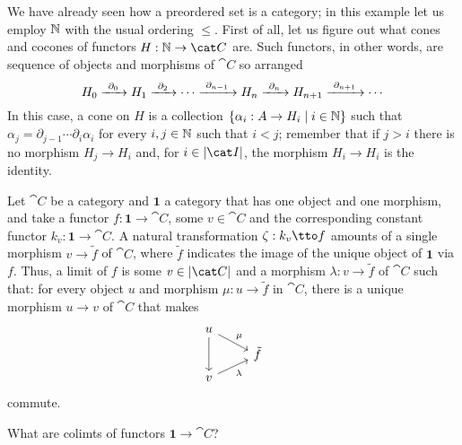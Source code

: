\begin{example}
We have already seen how a preordered set is a category; in this example let us employ \(\mathbb N\) with the usual ordering \(\le\). First of all, let us figure out what cones and cocones of functors \(H : \naturals \to \cat C\) are. Such functors, in other words, are sequence of objects and morphisms of \(\cat C\) so arranged
\[H_0 \xrightarrow{\ \partial_0\ } H_1 \xrightarrow{\ \partial_2\ } \cdots \xrightarrow{\ \partial_{n-1}\ } H_n \xrightarrow{\ \partial_n\ } H_{n+1} \xrightarrow{\ \partial_{n+1}\ } \cdots\]
In this case, a cone on \(H\) is a collection \(\left\{\alpha_i : A \to H_i \mid i \in \mathbb N\right\}\) such that \(\alpha_j = \partial_{j-1} \cdots \partial_i \alpha_i\) for every \(i, j \in \mathbb N\) such that \(i < j\); remember that if \(j > i\) there is no morphism \(H_j \to H_i\) and, for \(i \in \obj{\cat I}\), the morphism \(H_i \to H_i\) is the identity.
\end{example}

\begin{example}
 Let \(\cat C\) be a category and \(\mathbf 1\) a category that has one object and one morphism, and take a functor \(f : \mathbf 1 \to \cat C\), some \(v \in \cat C\) and the corresponding constant functor \(k_v : \mathbf 1 \to \cat C\). A natural transformation \(\zeta : k_v \tto f\) amounts of a single morphism \(v \to \tilde f\) of \(\cat C\), where \(\tilde f\) indicates the image of the unique object of \(\mathbf 1\) via \(f\). Thus, a limit of \(f\) is some \(v \in \obj{\cat C}\) and a morphism \(\lambda : v \to \tilde f\) of \(\cat C\) such that: for every object \(u\) and morphism \(\mu : u \to \tilde f\) in \(\cat C\), there is a unique morphism \(u \to v\) of \(\cat C\) that makes
\[\begin{tikzcd}[row sep=tiny]
u \ar["\mu", dr] \ar[dd] \\
& \tilde f \\
v \ar["\lambda", ur, swap]
\end{tikzcd}\]
commute.
\end{example}

\begin{exercise}
What are colimts of functors \(\mathbf 1 \to \cat C\)?
\end{exercise}

